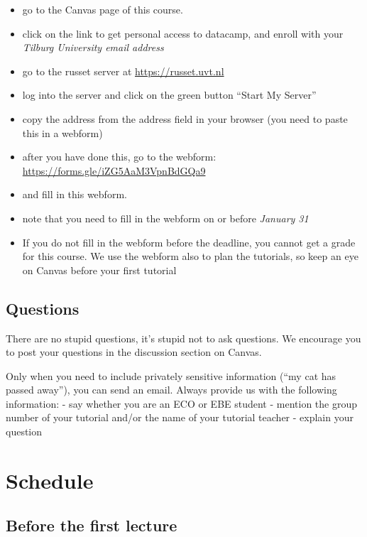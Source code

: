 \documentclass[]{book}
\providecommand{\tightlist}{%
  \setlength{\itemsep}{0pt}\setlength{\parskip}{0pt}}
\begin{document}
\begin{itemize}
\tightlist
\item
  go to the Canvas page of this course.
\item
  click on the link to get personal access to datacamp, and enroll with your \emph{Tilburg University email address}
\item
  go to the russet server at \url{https://russet.uvt.nl}
\item
  log into the server and click on the green button ``Start My Server''
\item
  copy the address from the address field in your browser (you need to paste this in a webform)
\item
  after you have done this, go to the webform: \url{https://forms.gle/iZG5AaM3VpnBdGQa9}
\item
  and fill in this webform.
\item
  note that you need to fill in the webform on or before \emph{January 31}
\item
  If you do not fill in the webform before the deadline, you cannot get a grade for this course. We use the webform also to plan the tutorials, so keep an eye on Canvas before your first tutorial
\end{itemize}

\hypertarget{questions}{%
\section{Questions}\label{questions}}

There are no stupid questions, it's stupid not to ask questions. We encourage you to post your questions in the discussion section on Canvas.

Only when you need to include privately sensitive information (``my cat has passed away''), you can send an email.
Always provide us with the following information:
- say whether you are an ECO or EBE student
- mention the group number of your tutorial and/or the name of your tutorial teacher
- explain your question

\hypertarget{schedule}{%
\chapter{Schedule}\label{schedule}}

\hypertarget{before-the-first-lecture}{%
\section{Before the first lecture}\label{before-the-first-lecture}}
\end{document}
